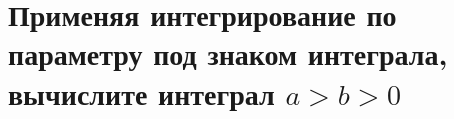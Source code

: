 \documentclass[a4paper, fleqn]{article}
\begin{document}



\section*{Применяя интегрирование по параметру под знаком интеграла, вычислите интеграл $a > b > 0$}

\end{document}
